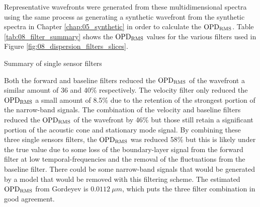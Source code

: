 Representative wavefronts were generated from these multidimensional spectra using the same process as generating a synthetic wavefront from the synthetic spectra in Chapter \ref{chap:05_synthetic} in order to calculate the $\operatorname{OPD_{RMS}}$.
Table \ref{tab:08_filter_summary} shows the $\operatorname{OPD_{RMS}}$ values for the various filters used in Figure \ref{fig:08_dispersion_filters_slices}.
\begin{table}
  \centering
  \caption{Summary of single sensor filters}
  
  \label{tab:08_filter_summary}
\end{table}
Both the forward and baseline filters reduced the $\operatorname{OPD_{RMS}}$ of the wavefront a similar amount of 36 and 40\% respectively.
The velocity filter only reduced the $\operatorname{OPD_{RMS}}$ a small amount of 8.5\% due to the retention of the strongest portion of the narrow-band signals.
The combination of the velocity and baseline filters reduced the $\operatorname{OPD_{RMS}}$ of the wavefront by 46\% but those still retain a significant portion of the acoustic cone and stationary mode signal.
By combining these three single sensors filters, the $\operatorname{OPD_{RMS}}$ was reduced 58\% but this is likely under the true value due to some loss of the boundary-layer signal from the forward filter at low temporal-frequencies and the removal of the fluctuations from the baseline filter.
There could be some narrow-band signals that would be generated by a model that would be removed with this filtering scheme.
The estimated $\operatorname{OPD_{RMS}}$ from Gordeyev \cite{Gordeyev-2014-jcJndkHM} is $0.0112\ \mu m$, which puts the three filter combination in good agreement.


